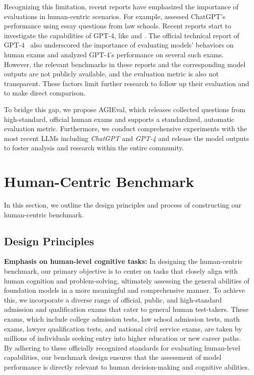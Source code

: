 Recognizing this limitation, recent reports have emphasized the importance of evaluations in human-centric scenarios. For example, \citet{choi2023chatgpt} assessed ChatGPT's performance using essay questions from law schools. Recent reports start to investigate the capabilities of GPT-4, like \citet{bubeck2023sparks} and \citet{openai2023gpt4}.
The official technical report of GPT-4~\citep{openai2023gpt4} also underscored the importance of evaluating models' behaviors on human exams and analyzed GPT-4's performance on several such exams. However, the relevant benchmarks in these reports and the corresponding model outputs are not publicly available, and the evaluation metric is also not transparent. These factors limit further research to follow up their evaluation and to make direct comparison.

To bridge this gap, we propose {AGIEval}, which releases collected questions from high-standard, official human exams and supports a standardized, automatic evaluation metric. Furthermore, we conduct comprehensive experiments with the most recent LLMs including \textit{ChatGPT} and \textit{GPT-4} and release the model outputs to foster analysis and research within the entire community.

\section{Human-Centric Benchmark} In this section, we outline the design principles and process of constructing our human-centric benchmark.
\subsection{Design Principles}
\par{\textbf{Emphasis on human-level cognitive tasks:} In designing the human-centric benchmark, our primary objective is to center on tasks that closely align with human cognition and problem-solving, ultimately assessing the general abilities of foundation models in a more meaningful and comprehensive manner. To achieve this, we incorporate a diverse range of official, public, and high-standard admission and qualification exams that cater to general human test-takers. These exams, which include college admission tests, law school admission tests, math exams, lawyer qualification tests, and national civil service exams, are taken by millions of individuals seeking entry into higher education or new career paths. By adhering to these officially recognized standards for evaluating human-level capabilities, our benchmark design ensures that the assessment of model performance is directly relevant to human decision-making and cognitive abilities.}

